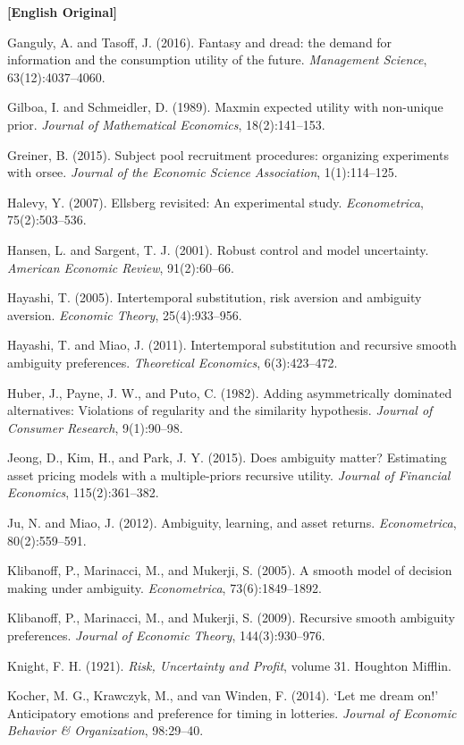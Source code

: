 \documentclass[12pt,a4paper]{ctexart}
\newenvironment{original}{%
  \par\medskip\noindent\textbf{[English Original]}\par\smallskip
  \color{black}\small
}{%
  \par\medskip
}
\theoremstyle{definition}
\theoremstyle{remark}
\begin{document}
\begin{original}
Ganguly, A. and Tasoff, J. (2016). Fantasy and dread: the demand for information and the consumption utility of the future. \textit{Management Science}, 63(12):4037--4060.

Gilboa, I. and Schmeidler, D. (1989). Maxmin expected utility with non-unique prior. \textit{Journal of Mathematical Economics}, 18(2):141--153.

Greiner, B. (2015). Subject pool recruitment procedures: organizing experiments with orsee. \textit{Journal of the Economic Science Association}, 1(1):114--125.

Halevy, Y. (2007). Ellsberg revisited: An experimental study. \textit{Econometrica}, 75(2):503--536.

Hansen, L. and Sargent, T. J. (2001). Robust control and model uncertainty. \textit{American Economic Review}, 91(2):60--66.

Hayashi, T. (2005). Intertemporal substitution, risk aversion and ambiguity aversion. \textit{Economic Theory}, 25(4):933--956.

Hayashi, T. and Miao, J. (2011). Intertemporal substitution and recursive smooth ambiguity preferences. \textit{Theoretical Economics}, 6(3):423--472.

Huber, J., Payne, J. W., and Puto, C. (1982). Adding asymmetrically dominated alternatives: Violations of regularity and the similarity hypothesis. \textit{Journal of Consumer Research}, 9(1):90--98.

Jeong, D., Kim, H., and Park, J. Y. (2015). Does ambiguity matter? Estimating asset pricing models with a multiple-priors recursive utility. \textit{Journal of Financial Economics}, 115(2):361--382.

Ju, N. and Miao, J. (2012). Ambiguity, learning, and asset returns. \textit{Econometrica}, 80(2):559--591.

Klibanoff, P., Marinacci, M., and Mukerji, S. (2005). A smooth model of decision making under ambiguity. \textit{Econometrica}, 73(6):1849--1892.

Klibanoff, P., Marinacci, M., and Mukerji, S. (2009). Recursive smooth ambiguity preferences. \textit{Journal of Economic Theory}, 144(3):930--976.

Knight, F. H. (1921). \textit{Risk, Uncertainty and Profit}, volume 31. Houghton Mifflin.

Kocher, M. G., Krawczyk, M., and van Winden, F. (2014). `Let me dream on!' Anticipatory emotions and preference for timing in lotteries. \textit{Journal of Economic Behavior \& Organization}, 98:29--40.


\end{original}
\end{document}
